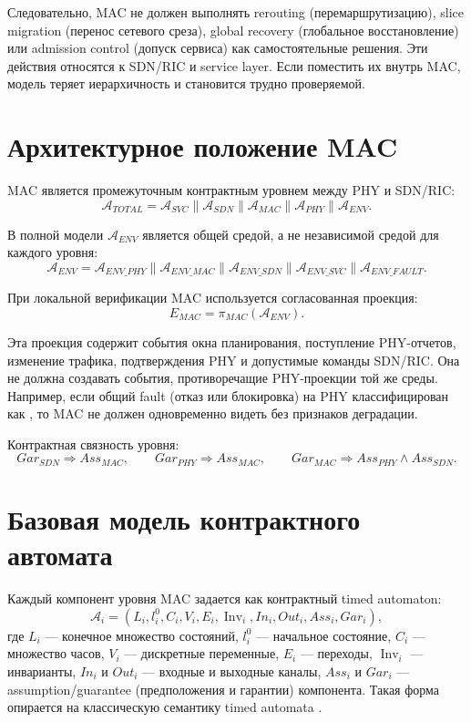 \documentclass[10pt,a4paper]{article}
\newcommand{\code}[1]{\ifmmode\text{\ttfamily\detokenize{#1}}\else\texttt{\detokenize{#1}}\fi}
\newcommand{\A}[1]{\mathcal{A}_{#1}}
\newcommand{\Env}{\mathcal{A}_{ENV}}
\newcommand{\Inv}{\operatorname{Inv}}
\begin{document}
Следовательно, MAC не должен выполнять rerouting (перемаршрутизацию), slice migration (перенос сетевого среза), global recovery (глобальное восстановление) или admission control (допуск сервиса) как самостоятельные решения. Эти действия относятся к SDN/RIC и service layer. Если поместить их внутрь MAC, модель теряет иерархичность и становится трудно проверяемой.

\section{Архитектурное положение MAC}

MAC является промежуточным контрактным уровнем между PHY и SDN/RIC:
\[
\A{TOTAL}=\A{SVC}\parallel \A{SDN}\parallel \A{MAC}\parallel \A{PHY}\parallel \Env.
\]

В полной модели \(\Env\) является общей средой, а не независимой средой для каждого уровня:
\[
\Env=\A{ENV\_PHY}\parallel \A{ENV\_MAC}\parallel
\A{ENV\_SDN}\parallel \A{ENV\_SVC}\parallel \A{ENV\_FAULT}.
\]

При локальной верификации MAC используется согласованная проекция:
\[
E_{MAC}=\pi_{MAC}(\Env).
\]

Эта проекция содержит события окна планирования, поступление PHY-отчетов, изменение трафика, подтверждения PHY и допустимые команды SDN/RIC. Она не должна создавать события, противоречащие PHY-проекции той же среды. Например, если общий fault (отказ или блокировка) на PHY классифицирован как \code{OUTAGE}, то MAC не должен одновременно видеть \code{RES_FREE} без признаков деградации.

Контрактная связность уровня:
\[
Gar_{SDN}\Rightarrow Ass_{MAC},\qquad
Gar_{PHY}\Rightarrow Ass_{MAC},\qquad
Gar_{MAC}\Rightarrow Ass_{PHY}\land Ass_{SDN}.
\]

\section{Базовая модель контрактного автомата}

Каждый компонент уровня MAC задается как контрактный timed automaton:
\[
\A{i}=(L_i,l_i^0,C_i,V_i,E_i,\Inv_i,In_i,Out_i,Ass_i,Gar_i),
\]
где \(L_i\) --- конечное множество состояний, \(l_i^0\) --- начальное состояние, \(C_i\) --- множество часов, \(V_i\) --- дискретные переменные, \(E_i\) --- переходы, \(\Inv_i\) --- инварианты, \(In_i\) и \(Out_i\) --- входные и выходные каналы, \(Ass_i\) и \(Gar_i\) --- assumption/guarantee (предположения и гарантии) компонента. Такая форма опирается на классическую семантику timed automata \cite{alur_dill}.
\end{document}
